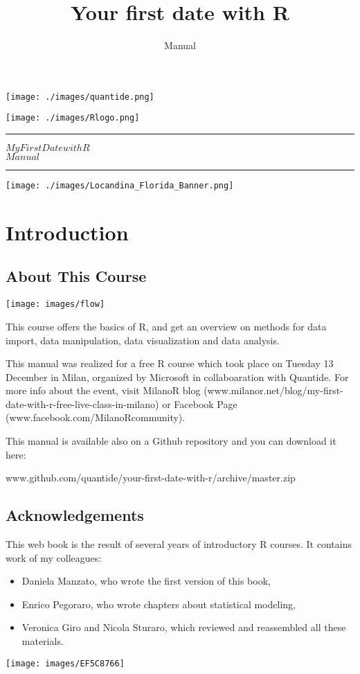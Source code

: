 \documentclass[]{book}
\title{Your first date with R}
\subtitle{Manual}
\author{}
\date{}
\providecommand{\tightlist}{%
  \setlength{\itemsep}{0pt}\setlength{\parskip}{0pt}}
\def\tightlist{}
\def\maketitle{%
  \null
  \thispagestyle{empty}%
  \hspace{-2cm}
   \begin{flushleft}\texttt{[image: ./images/quantide.png]}\end{flushleft}
  \vspace{-2cm}
  \begin{flushright}\texttt{[image: ./images/Rlogo.png]}\end{flushright}
  \vskip 3cm
  \hrule height 2pt
  \begin{center} \par \huge \strut \textbf{$My  First  Date  with  R$}\\ $Manual$ \par  \end{center}
  \vspace{0.5cm}
  \hrule height 2pt
  \vspace{0.5cm}
  \vspace{2cm}
  \texttt{[image: ./images/Locandina\_Florida\_Banner.png]}
  \clearpage
}
\begin{document}
\maketitle

{
\setcounter{tocdepth}{1}
\tableofcontents
}
\chapter{Introduction}\label{introduction}

\section{About This Course}\label{about-this-course}

\texttt{[image: images/flow]}

This course offers the basics of R, and get an overview on methods for
data import, data manipulation, data visualization and data analysis.

This manual was realized for a free R course which took place on Tuesday
13 December in Milan, organized by Microsoft in collaboaration with
Quantide. For more info about the event, visit MilanoR blog
(www.milanor.net/blog/my-first-date-with-r-free-live-class-in-milano) or
Facebook Page (www.facebook.com/MilanoRcommunity).

This manual is available also on a Github repository and you can
download it here:

www.github.com/quantide/your-first-date-with-r/archive/master.zip

\section{Acknowledgements}\label{acknowledgements}

This web book is the result of several years of introductory R courses.
It contains work of my colleagues:

\begin{itemize}
\tightlist
\item
  Daniela Manzato, who wrote the first version of this book,
\item
  Enrico Pegoraro, who wrote chapters about statistical modeling,
\item
  Veronica Giro and Nicola Sturaro, which reviewed and reassembled all
  these materials.
\end{itemize}

\texttt{[image: images/EF5C8766]}
\end{document}
